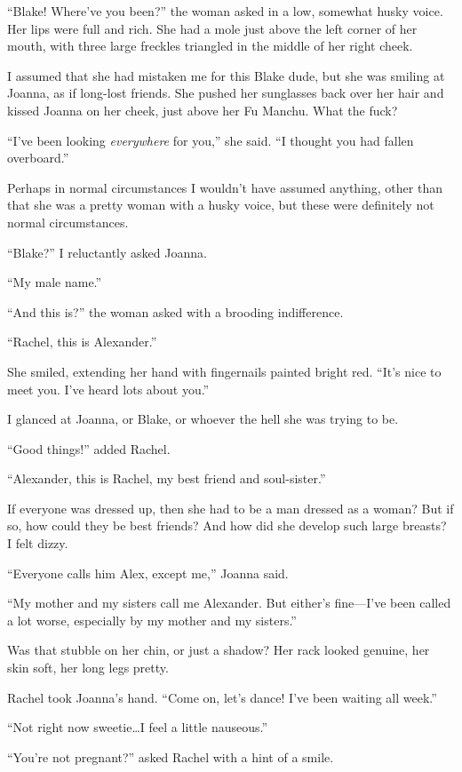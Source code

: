 ``Blake! Where've you been?'' the woman asked in a low, somewhat husky
voice. Her lips were full and rich. She had a mole just above the left
corner of her mouth, with three large freckles triangled in the middle
of her right cheek.

I assumed that she had mistaken me for this Blake dude, but she was
smiling at Joanna, as if long-lost friends. She pushed her sunglasses
back over her hair and kissed Joanna on her cheek, just above her Fu
Manchu. What the fuck?

``I've been looking \emph{everywhere} for you,'' she said. ``I thought
you had fallen overboard.''

Perhaps in normal circumstances I wouldn't have assumed anything, other
than that she was a pretty woman with a husky voice, but these were
definitely not normal circumstances.

``Blake?'' I reluctantly asked Joanna.

``My male name.''

``And this is?'' the woman asked with a brooding indifference.

``Rachel, this is Alexander.''

She smiled, extending her hand with fingernails painted bright red.
``It's nice to meet you. I've heard lots about you.''

I glanced at Joanna, or Blake, or whoever the hell she was trying to be.

``Good things!'' added Rachel.

``Alexander, this is Rachel, my best friend and soul-sister.''

If everyone was dressed up, then she had to be a man dressed as a woman?
But if so, how could they be best friends? And how did she develop such
large breasts? I felt dizzy.

``Everyone calls him Alex, except me,'' Joanna said.

``My mother and my sisters call me Alexander. But either's fine---I've
been called a lot worse, especially by my mother and my sisters.''

Was that stubble on her chin, or just a shadow? Her rack looked genuine,
her skin soft, her long legs pretty.

Rachel took Joanna's hand. ``Come on, let's dance! I've been waiting all
week.''

``Not right now sweetie\ldots I feel a little nauseous.''

``You're not pregnant?'' asked Rachel with a hint of a smile.

